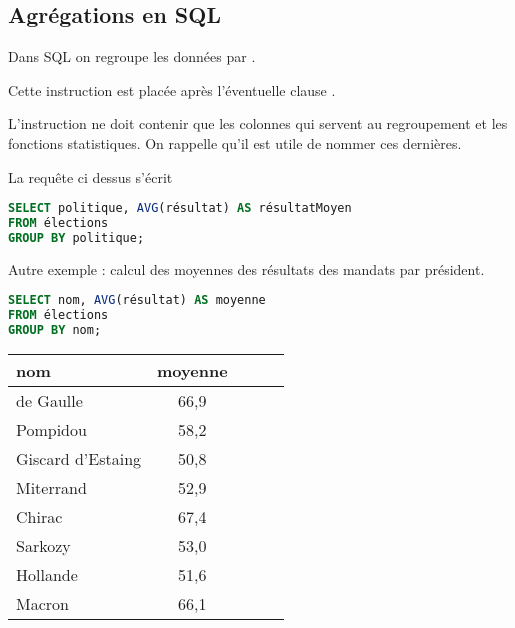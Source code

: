 \subsection{Agrégations en SQL}
Dans SQL on regroupe les données par . 

Cette instruction est placée après l'éventuelle clause . 

L'instruction  ne doit contenir que les colonnes qui servent au regroupement et les fonctions statistiques. On rappelle qu'il est utile de nommer ces dernières.

\medskip

La requête ci dessus s'écrit
\begin{lstlisting}[language=SQL]
SELECT politique, AVG(résultat) AS résultatMoyen
FROM élections
GROUP BY politique;
\end{lstlisting}

\medskip

Autre exemple : calcul des moyennes des résultats des mandats par président.

\medskip

\begin{minipage}{0.6\linewidth}
\begin{lstlisting}[language=SQL]
SELECT nom, AVG(résultat) AS moyenne
FROM élections
GROUP BY nom;
\end{lstlisting}
\end{minipage}
\begin{minipage}{0.4\linewidth}
\begin{center}
\begin{tabular}{|l|c|c|c|c|}
\hline
{\bf nom} & {\bf moyenne}\\
  \hline
de Gaulle &66,9 \\
Pompidou &58,2\\
Giscard d'Estaing &50,8\\
Miterrand &52,9\\
Chirac &67,4\\
Sarkozy &53,0\\
Hollande &51,6\\
Macron & 66,1\\
\hline
\end{tabular}
\end{center}
\end{minipage}

